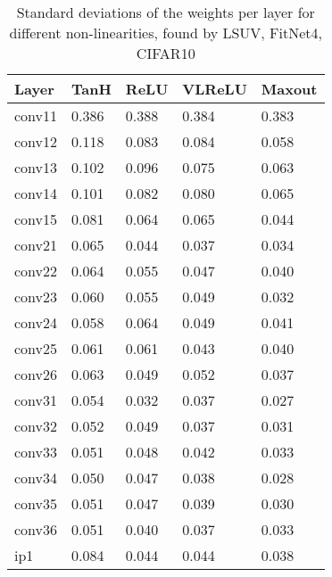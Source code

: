 \documentclass{article} \clearpage{}\usepackage{iclr2016_conference,times}
\begin{document}
\begin{table}[htb]
\caption{Standard deviations of the weights per layer for different non-linearities, found by LSUV, FitNet4, CIFAR10}
\label{tab:lsuv-std}
\centering
\begin{tabular}{lllll}
\hline
Layer&TanH&ReLU&VLReLU&Maxout\\
\hline
conv11&0.386&0.388&0.384&0.383\\
conv12&0.118&0.083&0.084&0.058\\
conv13&0.102&0.096&0.075&0.063\\
conv14&0.101&0.082&0.080&0.065\\
conv15&0.081&0.064&0.065&0.044\\
\hline
conv21&0.065&0.044&0.037&0.034\\
conv22&0.064&0.055&0.047&0.040\\
conv23&0.060&0.055&0.049&0.032\\
conv24&0.058&0.064&0.049&0.041\\
conv25&0.061&0.061&0.043&0.040\\
conv26&0.063&0.049&0.052&0.037\\
\hline
conv31&0.054&0.032&0.037&0.027\\
conv32&0.052&0.049&0.037&0.031\\
conv33&0.051&0.048&0.042&0.033\\
conv34&0.050&0.047&0.038&0.028\\
conv35&0.051&0.047&0.039&0.030\\
conv36&0.051&0.040&0.037&0.033\\
\hline
ip1&0.084&0.044&0.044&0.038\\
\hline
\end{tabular}
\end{table}
\end{document}
